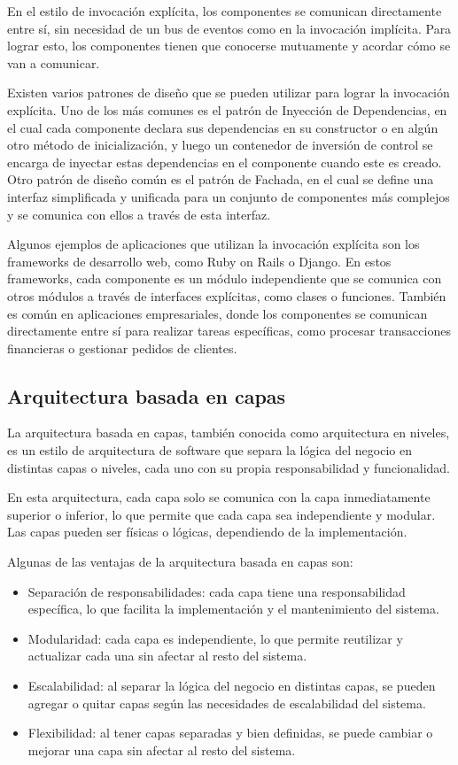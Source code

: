 \documentclass[executivepaper]{article}
\begin{document}
En el estilo de invocación explícita, los componentes se comunican directamente entre sí, sin necesidad de un bus de eventos como en la invocación implícita. Para lograr esto, los componentes tienen que conocerse mutuamente y acordar cómo se van a comunicar.

Existen varios patrones de diseño que se pueden utilizar para lograr la invocación explícita. Uno de los más comunes es el patrón de Inyección de Dependencias, en el cual cada componente declara sus dependencias en su constructor o en algún otro método de inicialización, y luego un contenedor de inversión de control se encarga de inyectar estas dependencias en el componente cuando este es creado. Otro patrón de diseño común es el patrón de Fachada, en el cual se define una interfaz simplificada y unificada para un conjunto de componentes más complejos y se comunica con ellos a través de esta interfaz.

Algunos ejemplos de aplicaciones que utilizan la invocación explícita son los frameworks de desarrollo web, como Ruby on Rails o Django. En estos frameworks, cada componente es un módulo independiente que se comunica con otros módulos a través de interfaces explícitas, como clases o funciones. También es común en aplicaciones empresariales, donde los componentes se comunican directamente entre sí para realizar tareas específicas, como procesar transacciones financieras o gestionar pedidos de clientes.

\newpage
\subsection{Arquitectura basada en capas}

La arquitectura basada en capas, también conocida como arquitectura en niveles, es un estilo de arquitectura de software que separa la lógica del negocio en distintas capas o niveles, cada uno con su propia responsabilidad y funcionalidad.

En esta arquitectura, cada capa solo se comunica con la capa inmediatamente superior o inferior, lo que permite que cada capa sea independiente y modular. Las capas pueden ser físicas o lógicas, dependiendo de la implementación.

Algunas de las ventajas de la arquitectura basada en capas son:

\begin{itemize}
\item Separación de responsabilidades: cada capa tiene una responsabilidad específica, lo que facilita la implementación y el mantenimiento del sistema.
\item Modularidad: cada capa es independiente, lo que permite reutilizar y actualizar cada una sin afectar al resto del sistema.
\item Escalabilidad: al separar la lógica del negocio en distintas capas, se pueden agregar o quitar capas según las necesidades de escalabilidad del sistema.
\item Flexibilidad: al tener capas separadas y bien definidas, se puede cambiar o mejorar una capa sin afectar al resto del sistema.
\end{itemize}
\end{document}
